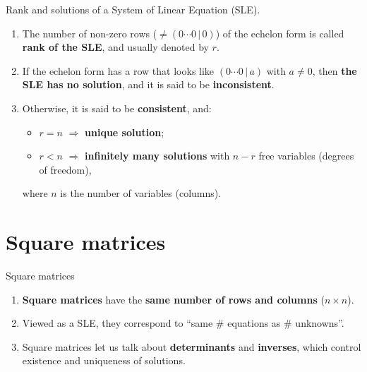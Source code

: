 \documentclass[9pt]{beamer}
\begin{document}
\begin{frame}{Rank and solutions of a System of Linear Equation (SLE).}

    \begin{enumerate}[leftmargin = 0.6cm, label = $\bullet$, rightmargin = 0.4cm]
                
        \item The number of non-zero rows ($\neq (0 \cdots 0\, |\, 0)$) of the echelon form is called \textbf{rank of the SLE}, and usually denoted by $r$.\medskip

        \item If the echelon form has a row that looks like $(0 \cdots 0\, |\, a)$ with \(a\neq 0\), then \textbf{the SLE has no solution}, and it is said to be \textbf{inconsistent}.\medskip
        
        \item Otherwise, it is said to be \textbf{consistent}, and:
        \begin{itemize}
            \item $r=n$ \(\Rightarrow\) \textbf{unique solution};
            \item \(r<n\) \(\Rightarrow\) \textbf{infinitely many solutions} with \(n-r\) free variables (degrees of freedom),
        \end{itemize}
        where $n$ is the number of variables (columns).
        
    \end{enumerate}
    
\end{frame}


\section{Square matrices}

\begin{frame}{Square matrices}

\begin{enumerate}[leftmargin = 0.6cm, label = $\bullet$, rightmargin = 0.4cm]

    \item \textbf{Square matrices} have the \textbf{same number of rows and columns} (\(n\times n\)).\medskip

    \item Viewed as a SLE, they correspond to ``same \# equations as \# unknowns''.\medskip

    \item Square matrices let us talk about \textbf{determinants} and \textbf{inverses}, which control existence and uniqueness of solutions.

\end{enumerate}

\end{frame}
\end{document}
